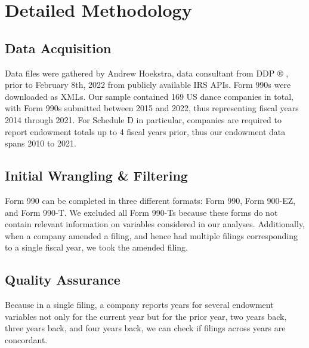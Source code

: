 \documentclass[Dance Data
Project,article,submit,moreauthors,pdftex]{mdpi}
\begin{document}
\hypertarget{detailed-methodology}{%
\section{Detailed Methodology}\label{detailed-methodology}}

\hypertarget{data-acquisition}{%
\subsection{Data Acquisition}\label{data-acquisition}}

Data files were gathered by Andrew Hoekstra, data consultant from DDP ®
, prior to February 8th, 2022 from publicly available IRS APIs. Form
990s were downloaded as XMLs. Our sample contained 169 US dance
companies in total, with Form 990s submitted between 2015 and 2022, thus
representing fiscal years 2014 through 2021. For Schedule D in
particular, companies are required to report endowment totals up to 4
fiscal years prior, thus our endowment data spans 2010 to 2021.

\hypertarget{initial-wrangling-filtering}{%
\subsection{Initial Wrangling \&
Filtering}\label{initial-wrangling-filtering}}

Form 990 can be completed in three different formats: Form 990, Form
900-EZ, and Form 990-T. We excluded all Form 990-Ts because these forms
do not contain relevant information on variables considered in our
analyses. Additionally, when a company amended a filing, and hence had
multiple filings corresponding to a single fiscal year, we took the
amended filing.

\hypertarget{quality-assurance}{%
\subsection{Quality Assurance}\label{quality-assurance}}

Because in a single filing, a company reports years for several
endowment variables not only for the current year but for the prior
year, two years back, three years back, and four years back, we can
check if filings across years are concordant.
\end{document}
